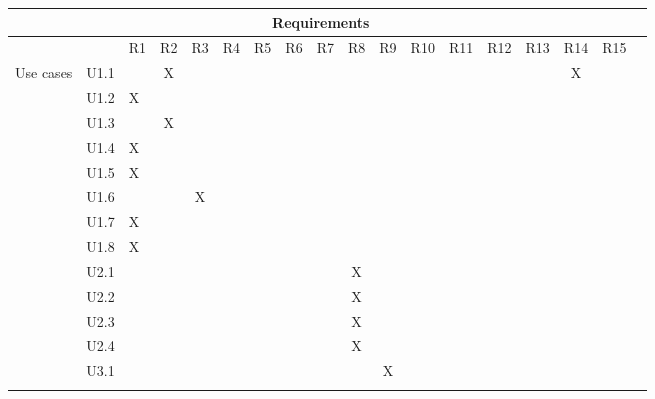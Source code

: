 \documentclass[hidelinks, 12pt, a4paper]{article}
\begin{document}
\begin{table}[H]
      \centering
      \begin{tabular}{|l|l|l|c|c|c|c|c|c|c|c|c|c|c|c|c|c|c|}
            \hline

            \multicolumn{17}{|c|}{Requirements}                                                       \\ \hline
             &       & R1 & R2 & R3 & R4 & R5 & R6 & R7 & R8 & R9 & R10 & R11 & R12 & R13 & R14 & R15 \\ \hline
            \multirow{29}{*}{Use cases}

             & U1.1  &    & X  &    &    &    &    &    &    &    &     &     &     &     & X   &     \\ \cline{2-17}
             & U1.2  & X  &    &    &    &    &    &    &    &    &     &     &     &     &     &     \\ \cline{2-17}
             & U1.3  &    & X  &    &    &    &    &    &    &    &     &     &     &     &     &     \\ \cline{2-17}
             & U1.4  & X  &    &    &    &    &    &    &    &    &     &     &     &     &     &     \\ \cline{2-17}
             & U1.5  & X  &    &    &    &    &    &    &    &    &     &     &     &     &     &     \\ \cline{2-17}
             & U1.6  &    &    & X  &    &    &    &    &    &    &     &     &     &     &     &     \\ \cline{2-17}
             & U1.7  & X  &    &    &    &    &    &    &    &    &     &     &     &     &     &     \\ \cline{2-17}
             & U1.8  & X  &    &    &    &    &    &    &    &    &     &     &     &     &     &     \\ \cline{2-17}
             & U2.1  &    &    &    &    &    &    &    & X  &    &     &     &     &     &     &     \\ \cline{2-17}
             & U2.2  &    &    &    &    &    &    &    & X  &    &     &     &     &     &     &     \\ \cline{2-17}
             & U2.3  &    &    &    &    &    &    &    & X  &    &     &     &     &     &     &     \\ \cline{2-17}
             & U2.4  &    &    &    &    &    &    &    & X  &    &     &     &     &     &     &     \\ \cline{2-17}
             & U3.1  &    &    &    &    &    &    &    &    & X  &     &     &     &     &     &     \\ \cline{2-17}

\end{tabular}
\end{table}
\end{document}
